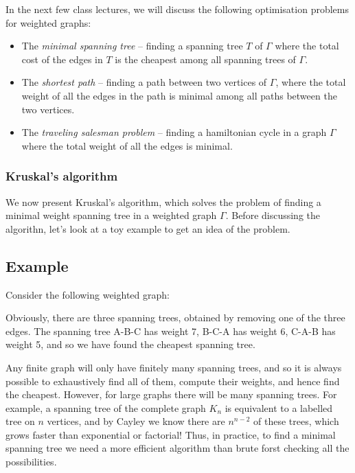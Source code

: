\documentclass[]{article}
\providecommand{\tightlist}{%
  \setlength{\itemsep}{0pt}\setlength{\parskip}{0pt}}
\begin{document}
In the next few class lectures, we will discuss the following
optimisation problems for weighted graphs:

\begin{itemize}
\tightlist
\item
  The \emph{minimal spanning tree} -- finding a spanning tree \(T\) of
  \(\Gamma\) where the total cost of the edges in \(T\) is the cheapest
  among all spanning trees of \(\Gamma\).
\item
  The \emph{shortest path} -- finding a path between two vertices of
  \(\Gamma\), where the total weight of all the edges in the path is
  minimal among all paths between the two vertices.
\item
  The \emph{traveling salesman problem} -- finding a hamiltonian cycle
  in a graph \(\Gamma\) where the total weight of all the edges is
  minimal.
\end{itemize}

\subsubsection{Kruskal's algorithm}\label{kruskals-algorithm}

We now present Kruskal's algorithm, which solves the problem of finding
a minimal weight spanning tree in a weighted graph \(\Gamma\). Before
discussing the algorithn, let's look at a toy example to get an idea of
the problem.

\subsection{Example}\label{example-5}

Consider the following weighted graph:

Obviously, there are three spanning trees, obtained by removing one of
the three edges. The spanning tree A-B-C has weight 7, B-C-A has weight
6, C-A-B has weight 5, and so we have found the cheapest spanning tree.

Any finite graph will only have finitely many spanning trees, and so it
is always possible to exhaustively find all of them, compute their
weights, and hence find the cheapest. However, for large graphs there
will be many spanning trees. For example, a spanning tree of the
complete graph \(K_n\) is equivalent to a labelled tree on \(n\)
vertices, and by Cayley we know there are \(n^{n-2}\) of these trees,
which grows faster than exponential or factorial! Thus, in practice, to
find a minimal spanning tree we need a more efficient algorithm than
brute forst checking all the possibilities.
\end{document}
